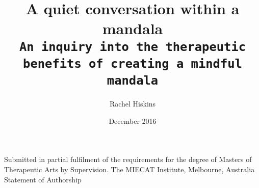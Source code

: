 \documentclass{book}
\author{Rachel Hiskins}
\title{{\Huge A quiet conversation within a mandala}\\[15pt]
\space
\texttt{An inquiry into the therapeutic \\benefits of creating a mindful mandala}}
\date {December 2016}
\begin{document}
\begin{titlepage}
	\calligra
    \maketitle
\end{titlepage}
\doublespacing 

\begin{description}
\item[ Submitted in partial fulfilment of the requirements for the degree of Masters of Therapeutic Arts by Supervision. The MIECAT Institute, Melbourne, Australia
Statement of Authorship] 
\end{description}
	





	
	
	
	
	

	
	
	
	




\end{document}
